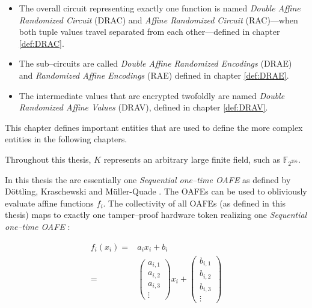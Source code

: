 \begin{itemize}

  \item The overall circuit representing exactly one function is named
    \emph{Double Affine Randomized Circuit} (DRAC) and \emph{Affine Randomized
    Circuit} (RAC)---when both tuple values travel separated from each
    other---defined in chapter \ref{def:DRAC}.

  \item The sub--circuits are called \emph{Double Affine Randomized Encodings}
    (DRAE) and \emph{Randomized Affine Encodings} (RAE) defined in chapter
    \ref{def:DRAE}.

  \item The intermediate values that are encrypted twofoldly are named
    \emph{Double Randomized Affine Values} (DRAV), defined in chapter
    \ref{def:DRAV}.

\end{itemize}


%
%
\label{sec:rae-definitions}

This chapter defines important entities that are used to define the more complex
entities in the following chapters.

\label{sec:field}

\label{def:field} Throughout this thesis, $K$ represents an arbitrary large
finite field, such as $\mathbb{F}_{2^{256}}$.




In this thesis the  are
essentially one \emph{Sequential one--time OAFE} as defined by Döttling,
Kraschewski and Müller-Quade \cite{davidgoliath}. The OAFEs can be used to
obliviously evaluate affine functions $f_i$. The collectivity of all OAFEs (as
defined in this thesis) maps to exactly one tamper--proof hardware token
realizing one \emph{Sequential one--time OAFE} \cite{davidgoliath}:

\begin{align*}
  f_i(x_i) = &
  a_ix_i + b_i \\
%
  = &
\begin{pmatrix}a_{i,1}\\a_{i,2}\\a_{i,3}\\\vdots\end{pmatrix}x_i +
\begin{pmatrix}b_{i,1}\\b_{i,2}\\b_{i,3}\\\vdots\end{pmatrix}
\end{align*}

